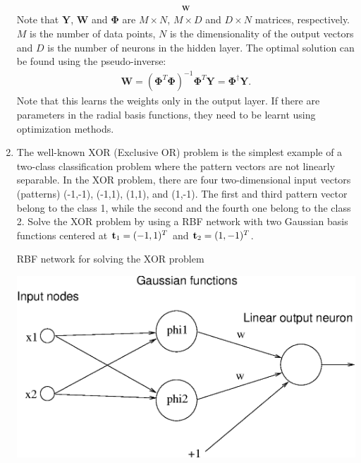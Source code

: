 \begin{enumerate}
\begin{solution}
\begin{align*}
{      }_{\mathbf{W}}
    \end{align*}
    Note that $\mathbf{Y}$, $\mathbf{W}$ and $\mathbf{\Phi}$ are $M
    \times N$, $M \times D$ and $D \times N$ matrices, respectively.
    $M$ is the number of data points, $N$ is the dimensionality of the
    output vectors and $D$ is the number of neurons in the hidden
    layer.  The optimal solution can be found using the
    pseudo-inverse:
    \begin{align*}
      \mathbf{W} = (\mathbf{\Phi}^T\mathbf{\Phi})^{-1} \mathbf{\Phi}^T
      \mathbf{Y} = \mathbf{\Phi}^{\dagger} \mathbf{Y}.
    \end{align*}
    Note that this learns the weights only in the output layer.  If
    there are parameters in the radial basis functions, they need to
    be learnt using optimization methods.

  \end{solution}


\item The well-known XOR (Exclusive OR) problem is the simplest example of a
  two-class classification problem where the pattern vectors are not linearly
  separable. In the XOR problem, there are four two-dimensional input vectors
  (patterns) (-1,-1), (-1,1), (1,1), and (1,-1). The first and third pattern
  vector belong to the class 1, while the second and the fourth one belong
  to the class 2. Solve the XOR problem by using a RBF network with two
  Gaussian basis functions centered at ${\bf t}_1 = (-1,1)^T$ and
  ${\bf t}_2 = (1,-1)^T$.

  \begin{solution}

    RBF network for solving the XOR problem

    \begin{center}
      \includegraphics[scale=0.7]{v102-f1.eps}
    \end{center}


\end{solution}
\end{enumerate}
